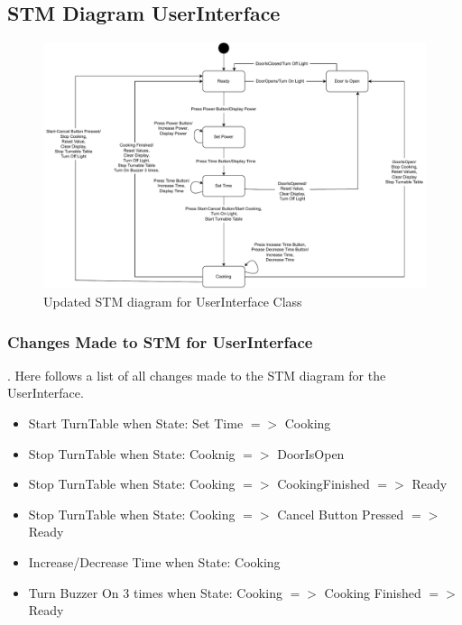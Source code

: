 \newpage

\subsection{STM Diagram UserInterface}
\begin{figure}[h]
  \centering
  \includegraphics[scale=0.6]{02-Body/Image/STM_UserInterfacer.pdf}
  \caption{Updated STM diagram for UserInterface Class}%
  \label{fig:UserInterfaceSTM}
\end{figure}

\subsubsection{Changes Made to STM for UserInterface}.
Here follows a list of all changes made to the STM diagram for the UserInterface.

\begin{itemize}
  \item Start TurnTable when State: Set Time $=>$ Cooking
  \item Stop TurnTable when State: Cooknig $=>$ DoorIsOpen
  \item Stop TurnTable when State: Cooking $=>$ CookingFinished $=>$ Ready
  \item Stop TurnTable when State: Cooking $=>$ Cancel Button Pressed $=>$ Ready
  \item Increase/Decrease Time when State: Cooking
  \item Turn Buzzer On 3 times when State: Cooking $=>$ Cooking Finished $=>$ Ready 
\end{itemize}

\newpage

